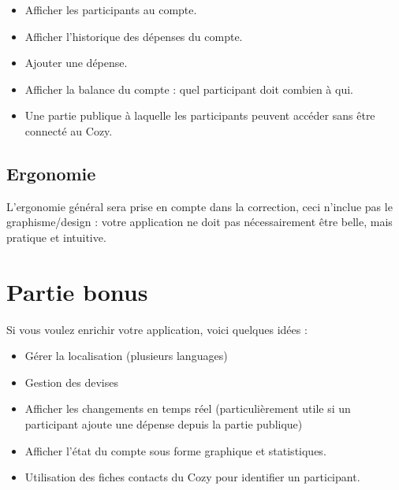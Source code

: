 \documentclass{42-fr}
\begin{document}
        \begin{itemize}\itemsep1pt
            \item Afficher les participants au compte.
            \item Afficher l'historique des d\'epenses du compte.
			\item Ajouter une d\'epense.
			\item Afficher la balance du compte : quel participant doit combien à qui.
	        \item Une partie publique à laquelle les participants peuvent acc\'eder sans 
				\^etre connect\'e au Cozy.
        \end{itemize}


    \section{Ergonomie}

        L'ergonomie g\'en\'eral sera prise en compte dans la correction,
		ceci n'inclue pas le graphisme/design : votre application ne doit
		pas n\'ecessairement \^etre belle, mais pratique et intuitive.
		



\chapter{Partie bonus}

    Si vous voulez enrichir votre application, voici quelques id\'ees :\newline

    \begin{itemize}\itemsep1pt
		\item Gérer la localisation (plusieurs languages)
        \item Gestion des devises
		\item Afficher les changements en temps r\'eel (particuli\`erement utile si
			un participant ajoute une d\'epense depuis la partie publique)
		\item Afficher l'\'etat du compte sous forme graphique et statistiques.
		\item Utilisation des fiches contacts du Cozy pour identifier un participant.
    \end{itemize}
\end{document}
